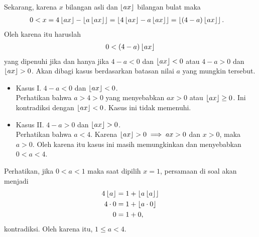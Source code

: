 \documentclass[12pt]{scrartcl}
\begin{document}
    Sekarang, karena $x$ bilangan asli dan $\left\lfloor ax \right\rfloor$ bilangan bulat maka
    \begin{align*}
        0 < x &= 4\left\lfloor ax \right\rfloor - \left\lfloor a\left\lfloor ax \right\rfloor \right\rfloor = \left\lfloor 4\left\lfloor ax \right\rfloor - a\left\lfloor ax \right\rfloor \right\rfloor = \left\lfloor (4-a)\left\lfloor ax \right\rfloor \right\rfloor.
    \end{align*}
    Oleh karena itu haruslah
    \begin{align*}
        0 < (4-a)\left\lfloor ax \right\rfloor
    \end{align*}
    yang dipenuhi jika dan hanya jika $4-a < 0$ dan $\left\lfloor ax \right\rfloor < 0$ atau $4-a > 0$ dan $\left\lfloor ax \right\rfloor > 0$. Akan dibagi kasus berdasarkan batasan nilai $a$ yang mungkin tersebut.
    \begin{itemize}
        \item Kasus I. $4-a < 0$ dan $\left\lfloor ax \right\rfloor < 0$.\\
        Perhatikan bahwa $a > 4 > 0$ yang menyebabkan $ax > 0$ atau $\left\lfloor ax \right\rfloor \ge 0$. Ini kontradiksi dengan $\left\lfloor ax \right\rfloor < 0$. Kasus ini tidak memenuhi.
        \item Kasus II. $4-a > 0$ dan $\left\lfloor ax \right\rfloor > 0$.\\
        Perhatikan bahwa $a < 4$. Karena $\left\lfloor ax \right\rfloor > 0 \implies ax > 0$ dan $x > 0$, maka $a > 0$. Oleh karena itu kasus ini masih memungkinkan dan menyebabkan $0 < a < 4$.
    \end{itemize}

    \newpage
    
    Perhatikan, jika $0 < a < 1$ maka saat dipilih $x=1$, persamaan di soal akan menjadi
    \begin{align*}
        4\left\lfloor a \right\rfloor &= 1 + \left\lfloor a\left\lfloor a \right\rfloor \right\rfloor\\
        4 \cdot 0 &= 1 + \left\lfloor a \cdot 0 \right\rfloor\\
        0 &= 1 + 0,
    \end{align*}
    kontradiksi. Oleh karena itu, $1 \le a < 4$.
    
\end{document}

